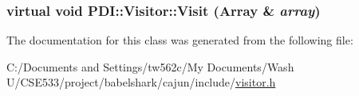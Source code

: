 \hypertarget{class_p_d_i_1_1_visitor_dc45ae6e7931b599be5e5e1765a2e349}{
\subsubsection[{Visit}]{\setlength{\rightskip}{0pt plus 5cm}virtual void PDI::Visitor::Visit ({\bf Array} \& {\em array})}}
\label{class_p_d_i_1_1_visitor_dc45ae6e7931b599be5e5e1765a2e349}




The documentation for this class was generated from the following file:\begin{CompactItemize}
\item 
C:/Documents and Settings/tw562c/My Documents/Wash U/CSE533/project/babelshark/cajun/include/\hyperlink{visitor_8h}{visitor.h}\end{CompactItemize}
